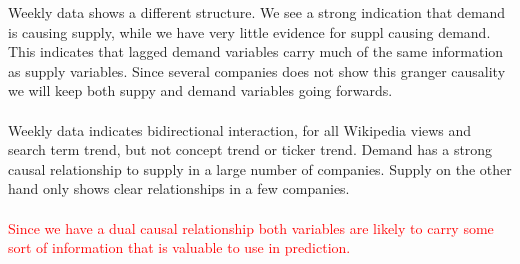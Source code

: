 Weekly data shows a different structure. We see a strong indication that demand is causing supply, while we have very little evidence for suppl causing demand. This indicates that lagged demand variables carry much of the same information as supply variables. Since several companies does not show this granger causality we will keep both suppy and demand variables going forwards. 
\\\\
Weekly data indicates bidirectional interaction, for all Wikipedia views and search term trend, but not concept trend or ticker trend. Demand has a strong causal relationship to supply in a large number of companies. Supply on the other hand only shows clear relationships in a few companies.  
\\\\
\textcolor{red}{Since we have a dual causal relationship both variables are likely to carry some sort of information that is valuable to use in prediction. }


\begin{table}[]
\caption{Granger causality for log-median normalized daily data} \label{tab:gr_caus_daily}
\centering
{}
\end{table}

\begin{table}[]
\caption{Granger causality for log-median normalized weekly data} \label{tab:gr_caus_weekly}
\centering
{}
\end{table}


\cleardoublepage